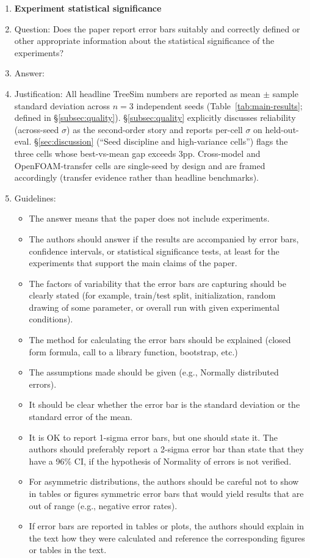 \begin{enumerate}
\item {\bf Experiment statistical significance}
    \item[] Question: Does the paper report error bars suitably and correctly defined or other appropriate information about the statistical significance of the experiments?
    \item[] Answer: \answerYes{}
    \item[] Justification: All headline TreeSim numbers are reported as mean $\pm$ sample standard deviation across $n=3$ independent seeds (Table~\ref{tab:main-results}; defined in \S\ref{subsec:quality}). \S\ref{subsec:quality} explicitly discusses reliability (across-seed $\sigma$) as the second-order story and reports per-cell $\sigma$ on held-out-eval. \S\ref{sec:discussion} (``Seed discipline and high-variance cells'') flags the three cells whose best-vs-mean gap exceeds 3pp. Cross-model and OpenFOAM-transfer cells are single-seed by design and are framed accordingly (transfer evidence rather than headline benchmarks).
    \item[] Guidelines:
    \begin{itemize}
        \item The answer \answerNA{} means that the paper does not include experiments.
        \item The authors should answer \answerYes{} if the results are accompanied by error bars, confidence intervals, or statistical significance tests, at least for the experiments that support the main claims of the paper.
        \item The factors of variability that the error bars are capturing should be clearly stated (for example, train/test split, initialization, random drawing of some parameter, or overall run with given experimental conditions).
        \item The method for calculating the error bars should be explained (closed form formula, call to a library function, bootstrap, etc.)
        \item The assumptions made should be given (e.g., Normally distributed errors).
        \item It should be clear whether the error bar is the standard deviation or the standard error of the mean.
        \item It is OK to report 1-sigma error bars, but one should state it. The authors should preferably report a 2-sigma error bar than state that they have a 96\% CI, if the hypothesis of Normality of errors is not verified.
        \item For asymmetric distributions, the authors should be careful not to show in tables or figures symmetric error bars that would yield results that are out of range (e.g., negative error rates).
        \item If error bars are reported in tables or plots, the authors should explain in the text how they were calculated and reference the corresponding figures or tables in the text.
    \end{itemize}


\end{enumerate}
